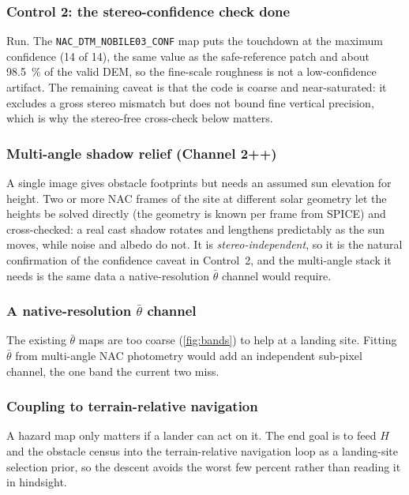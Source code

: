 \documentclass[11pt]{article}
\begin{document}
\subsubsection{Control 2: the stereo-confidence check \textemdash{} done}
Run. The \texttt{NAC\_DTM\_NOBILE03\_CONF} map \autocite{henriksen2017} puts the
touchdown at the maximum confidence (14 of 14), the same value as the safe-reference
patch and about \SI{98.5}{\percent} of the valid DEM, so the fine-scale roughness is
not a low-confidence artifact. The remaining caveat is that the code is coarse and
near-saturated: it excludes a gross stereo mismatch but does not bound fine vertical
precision, which is why the stereo-free cross-check below matters.

\subsubsection{Multi-angle shadow relief (Channel 2++)}
A single image gives obstacle footprints but needs an assumed sun elevation for height.
Two or more NAC frames of the site at different solar geometry let the heights be solved
directly (the geometry is known per frame from SPICE) and cross-checked: a real cast
shadow rotates and lengthens predictably as the sun moves, while noise and albedo do
not. It is \emph{stereo-independent}, so it is the natural confirmation of the
confidence caveat in Control~2, and the multi-angle stack it needs is the same data a
native-resolution $\bar\theta$ channel would require.

\subsubsection{A native-resolution $\bar\theta$ channel}
The existing $\bar\theta$ maps are too coarse (\cref{fig:bands}) to help at a landing
site. Fitting $\bar\theta$ from multi-angle NAC photometry would add an independent
sub-pixel channel, the one band the current two miss.

\subsubsection{Coupling to terrain-relative navigation}
A hazard map only matters if a lander can act on it. The end goal is to feed $H$ and
the obstacle census into the terrain-relative navigation loop as a landing-site
selection prior, so the descent avoids the worst few percent rather than reading it
in hindsight.

\end{document}

